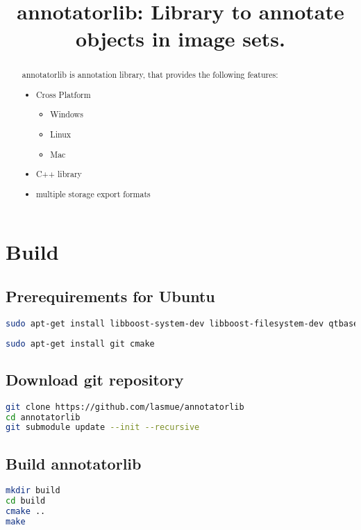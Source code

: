 \documentclass{article}
\begin{document}
\title{annotatorlib: Library to annotate objects in image sets.}

\maketitle

\begin{abstract}
\noindent
annotatorlib is annotation library, that provides the following features:

\begin{itemize}
  \item Cross Platform
  \begin{itemize}
    \item Windows
    \item Linux
    \item Mac
  \end{itemize}
  \item C++ library
  \item multiple storage export formats
\end{itemize}

\end{abstract}

\setcounter{tocdepth}{2}
\tableofcontents

\newpage
\section{Build}
\subsection{Prerequirements for Ubuntu}
\begin{lstlisting}[language=bash,caption={requrired libraries}]
sudo apt-get install libboost-system-dev libboost-filesystem-dev qtbase5-dev
\end{lstlisting}
\begin{lstlisting}[language=bash,caption={requrired applications}]
sudo apt-get install git cmake
\end{lstlisting}

\subsection{Download git repository}
\begin{lstlisting}[language=bash,caption={git}]
git clone https://github.com/lasmue/annotatorlib
cd annotatorlib
git submodule update --init --recursive
\end{lstlisting}

\subsection{Build annotatorlib}
\begin{lstlisting}[language=bash,caption={build}]
mkdir build
cd build
cmake ..
make
\end{lstlisting}
\end{document}

